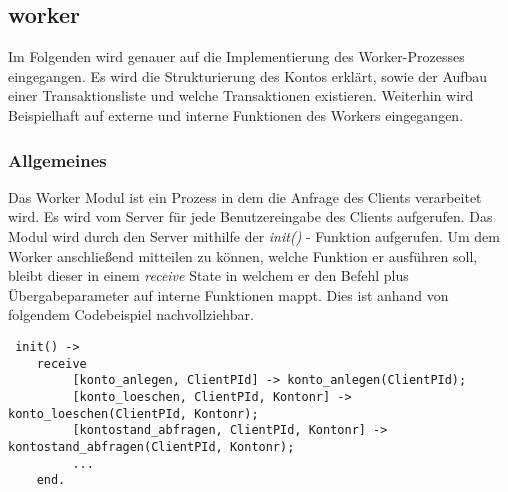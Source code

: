 \subsection{worker}
Im Folgenden wird genauer auf die Implementierung des Worker-Prozesses eingegangen. Es wird die Strukturierung des Kontos erklärt, sowie der Aufbau einer Transaktionsliste und welche Transaktionen existieren. Weiterhin wird Beispielhaft auf externe und interne Funktionen des Workers eingegangen.
\subsubsection{Allgemeines}
Das Worker Modul ist ein Prozess in dem die Anfrage des Clients verarbeitet wird. Es wird vom Server für jede Benutzereingabe des Clients aufgerufen. Das Modul wird durch den Server mithilfe der \textit{init()} - Funktion aufgerufen. Um dem Worker anschließend mitteilen zu können, welche Funktion er ausführen soll, bleibt dieser in einem \textit{receive} State in welchem er den Befehl plus Übergabeparameter auf interne Funktionen mappt. Dies ist anhand von folgendem Codebeispiel nachvollziehbar.
\begin{lstlisting}
 init() -> 
 	receive
 	     [konto_anlegen, ClientPId] -> konto_anlegen(ClientPId);
 	     [konto_loeschen, ClientPId, Kontonr] -> konto_loeschen(ClientPId, Kontonr);
 	     [kontostand_abfragen, ClientPId, Kontonr] -> kontostand_abfragen(ClientPId, Kontonr);
 	     ...
 	end.
\end{lstlisting}
